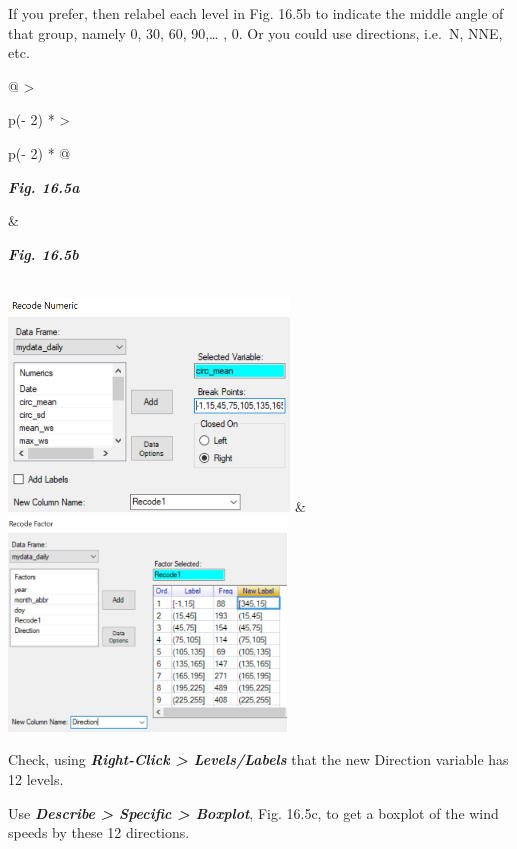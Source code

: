 \documentclass[
  letterpaper,
  DIV=11,
  numbers=noendperiod]{scrreprt}
\begin{document}
If you prefer, then relabel each level in Fig. 16.5b to indicate the
middle angle of that group, namely 0, 30, 60, 90,\ldots{} , 0. Or you
could use directions, i.e.~N, NNE, etc.

\begin{longtable}[]{@{}
  >{\raggedright\arraybackslash}p{(\columnwidth - 2\tabcolsep) * }
  >{\raggedright\arraybackslash}p{(\columnwidth - 2\tabcolsep) * }@{}}
\toprule\noalign{}
\begin{minipage}[b]{\linewidth}\raggedright
\textbf{\emph{Fig. 16.5a}}
\end{minipage} & \begin{minipage}[b]{\linewidth}\raggedright
\textbf{\emph{Fig. 16.5b}}
\end{minipage} \\
\midrule\noalign{}
\endhead
\bottomrule\noalign{}
\endlastfoot
\includegraphics[width=2.94119in,height=2.23234in]{figures/Fig16.5a.png}
&
\includegraphics[width=2.91094in,height=2.2395in]{figures/Fig16.5b.png} \\
\end{longtable}

Check, using \textbf{\emph{Right-Click \textgreater{} Levels/Labels}}
that the new Direction variable has 12 levels.

Use \textbf{\emph{Describe \textgreater{} Specific \textgreater{}
Boxplot}}, Fig. 16.5c, to get a boxplot of the wind speeds by these 12
directions.
\end{document}
